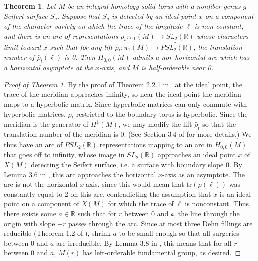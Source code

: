 \documentclass{article}
\theoremstyle{plain}
\newtheorem{theorem}{Theorem}[section]
\theoremstyle{definition}
\theoremstyle{plain}
\theoremstyle{plain}
\theoremstyle{plain}
\theoremstyle{remark}
\theoremstyle{remark}
\theoremstyle{plain}
\theoremstyle{plain}
\begin{document}
\begin{theorem}\label{thm:main}
Let $M$ be an integral homology solid torus with a nonfiber genus $g$ Seifert surface $S_g$. Suppose that $S_g$ is detected by an ideal point $x$ on a component of the character variety on which the trace of the longitude $\ell$ is non-constant, and there is an arc of representations $\rho_t: \pi_1(M) \to SL_2(\mathbb{R})$ whose characters limit toward $x$ such that for any lift $\widetilde{\rho_t}: \pi_1(M) \to \widetilde{PSL_2(\mathbb{R})}$, the translation number of $\widetilde{\rho_t}(\ell)$ is 0. Then $H_{0, 0}(M)$ admits a non-horizontal arc which has a horizontal asymptote at the $x$-axis, and $M$ is half-orderable near 0.
\end{theorem}

\begin{proof}[Proof of Theorem \ref{thm:main}]
By the proof of Theorem 2.2.1 in \cite{cullershalen}, at the ideal point, the trace of the meridian approaches infinity, so near the ideal point the meridian maps to a hyperbolic matrix. Since hyperbolic matrices can only commute with hyperbolic matrices, $\rho_t$ restricted to the boundary torus is hyperbolic. Since the meridian is the generator of $H^1(M)$, we may modify the lift $\widetilde{\rho_t}$ so that the translation number of the meridian is 0. (See Section 3.4 of \cite{cullerdunfield} for more details.) We thus have an arc of $\widetilde{PSL_2(\mathbb{R})}$ representations mapping to an arc in $H_{0, 0}(M)$ that goes off to infinity, whose image in $SL_2(\mathbb{R})$ approaches an ideal point $x$ of $X(M)$ detecting the Seifert surface, i.e. a surface with boundary slope 0. By Lemma 3.6 in \cite{gao}, this arc approaches the horizontal $x$-axis as an asymptote. The arc is not the horizontal $x$-axis, since this would mean that $\text{tr}(\rho(\ell))$ was constantly equal to 2 on this arc, contradicting the assumption that $x$ is an ideal point on a component of $X(M)$ for which the trace of $\ell$ is nonconstant. Thus, there exists some $a \in \mathbb{R}$ such that for $r$ between 0 and $a$, the line through the origin with slope $-r$ passes through the arc. Since at most three Dehn fillings are reducible (Theorem 1.2 of \cite{reducible}), shrink $a$ to be small enough so that all surgeries between 0 and $a$ are irreducible. By Lemma 3.8 in \cite{gao}, this means that for all $r$ between 0 and $a$, $M(r)$ has left-orderable fundamental group, as desired. 
\end{proof}
\end{document}
